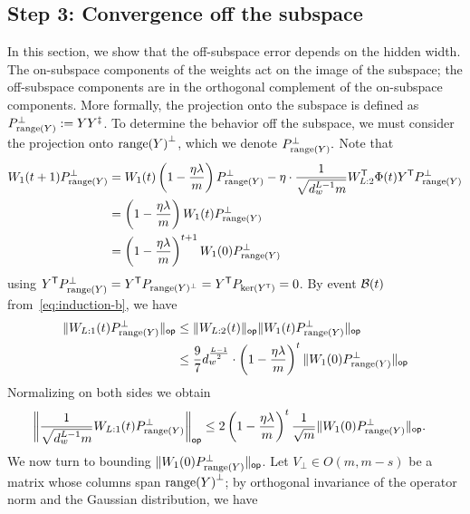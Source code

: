 \subsection{Step 3: Convergence off the subspace}
\label{sec:subsec:Step 3: Convergence off the subspace}
In this section, we show that the off-subspace error depends on the hidden width. 
The on-subspace components of the weights act on the image of the subspace; the off-subspace components are in the orthogonal complement of the on-subspace components.
More formally, the projection onto the subspace is defined as
 $P^{\perp}_{\range(Y)} := YY^{\ddag}$. 
To determine the behavior off the subspace, we must consider the projection onto ${\range(Y)}^{\perp}$, which we denote $P_{\range(Y)}^{\perp}.$
Note that
\begin{align*}
	W_{1}(t+1) P_{\range(Y)}^{\perp} & =
	W_{1}(t)\left(1 - \frac{\eta \lambda}{\din}\right) P_{\range(Y)}^{\perp} -
	\eta \cdot \frac{1}{\sqrt{d_w^{L-1}m}} W_{L:2}^{\T} \Phi(t) Y^{\T} P_{\range(Y)}^{\perp}                    \\
	                        & =
	\left(1 - \frac{\eta \lambda}{\din}\right) W_{1}(t)P_{\range(Y)}^{\perp}                                    \\
	                        & = \left(1 - \frac{\eta \lambda}{\din}\right)^{t+1} W_{1}(0) P_{\range(Y)}^{\perp}
\end{align*}
using $Y^{\T} P_{\range(Y)}^{\perp} = Y^{\T} P_{\range(Y)^{\perp}} = Y^{\T} P_{\ker(Y^{\T})} = 0$.
By event $\cB(t)$ from~\cref{eq:induction-b}, we have
\begin{align}
	\opnorm{W_{L:1}(t) P_{\range(Y)}^{\perp}} & \leq
    \opnorm{W_{L:2}(t)} \opnorm{W_{1}(t) P_{\range(Y)}^{\perp}}
 \notag \\
    &\leq
    \frac{9}{7} \dhid^{\frac{L - 1}{2}}
    \cdot
	\left(1 - \frac{\eta \lambda}{\din}\right)^t \opnorm{W_{1}{(0)} P_{\range(Y)}^{\perp}}
	\label{eq:W-perp-bound-refine-i}
\end{align}
Normalizing on both sides we obtain
\begin{align}
	\opnorm[\bigg]{\frac{1}{\sqrt{\dhid^{L-1} \din}}W_{L:1}(t) P_{\range(Y)}^{\perp}} & \leq  2 \left(1 - \frac{\eta \lambda}{\din}\right)^t \frac{1}{\sqrt{\din}} \opnorm{W_{1}(0) P_{\range(Y)}^{\perp}}.
\end{align}
We now turn to bounding $\opnorm{W_{1}(0) P_{\range(Y)}^{\perp}}$. 
Let $V_{\perp} \in O(m, m-s)$ be a matrix whose columns span ${\range(Y)}^{\perp}$;
by orthogonal invariance of the operator norm and
the Gaussian distribution, we have
